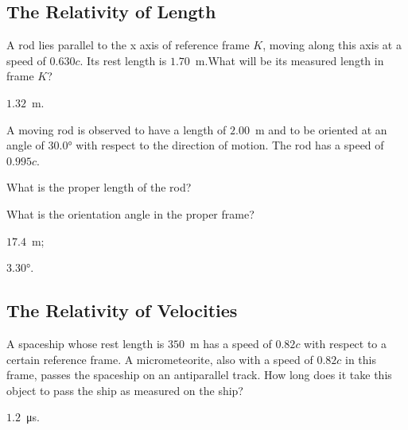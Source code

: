 \subsection{The Relativity of Length}


\begin{problem}
	A rod lies parallel to the x axis of reference frame $K$, moving
	along this axis at a speed of $0.630c$. Its rest length is $1.70$~m.What
	will be its measured length in frame $K$?
	\begin{solution}
		$1.32$~m.
	\end{solution}
\end{problem}


\begin{problem}
	A moving rod is observed to have a length of $2.00$~m and to be oriented at an angle of \ang{30.0} with respect to the direction of motion. The rod has a speed of $0.995c$. 
	\begin{enumerate*}[label=(\alph*)]
		\item What is the proper length of the rod?
		\item What is the orientation angle in the proper frame?
	\end{enumerate*}
	\begin{solution}
		\begin{enumerate*}[label=(\alph*)]
			\item $17.4$~m;
			\item \ang{3.30}.
		\end{enumerate*}
	\end{solution}
\end{problem}

\subsection{The Relativity of Velocities}

\begin{problem}
	A spaceship whose rest length is $350$~m has a speed of $0.82c$ with respect to a certain reference frame. A micrometeorite, also with a speed of $0.82c$ in this frame, passes the spaceship on an antiparallel track. How long does it take this object to pass the ship as measured on the ship?
	\begin{solution}
		$1.2$~\si{\micro\second}.
	\end{solution}
\end{problem}


